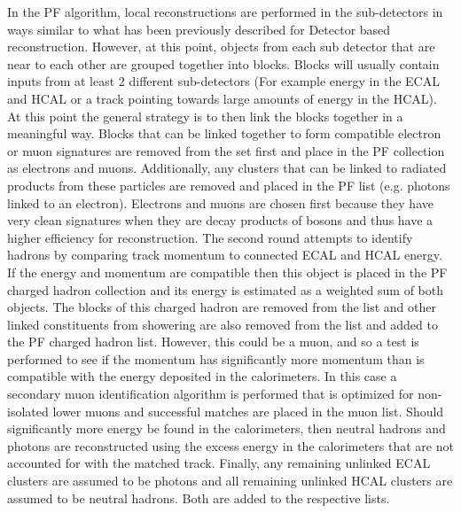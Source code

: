 	In the PF algorithm, local reconstructions are performed in the sub-detectors in ways similar to what has been previously described for Detector based reconstruction. However, at this point, objects from each sub detector that are near to each other are grouped together into blocks. Blocks will usually contain inputs from at least 2 different sub-detectors (For example energy in the ECAL and HCAL or a track pointing towards large amounts of energy in the HCAL). At this point the general strategy is to then link the blocks together in a meaningful way. Blocks that can be linked together to form compatible electron or muon signatures are removed from the set first and place in the PF collection as electrons and muons. Additionally, any clusters that can be linked to radiated products from these particles are removed and placed in the PF list (e.g. photons linked to an electron). Electrons and muons are chosen first because they have very clean signatures when they are decay products of bosons and thus have a higher efficiency for reconstruction. The second round attempts to identify hadrons by comparing track momentum to connected ECAL and HCAL energy. If the energy and momentum are compatible then this object is placed in the PF charged hadron collection and its energy is estimated as a weighted sum of both objects. The blocks of this charged hadron are removed from the list and other linked constituents from showering are also removed from the list and added to the PF charged hadron list. However, this could be a muon, and so a test is performed to see if the momentum has significantly more momentum than is compatible with the energy deposited in the calorimeters. In this case a secondary muon identification algorithm is performed that is optimized for non-isolated lower \pt muons and successful matches are placed in the muon list. Should significantly more energy be found in the calorimeters, then neutral hadrons and photons are reconstructed using the excess energy in the calorimeters that are not accounted for with the matched track. Finally, any remaining unlinked ECAL clusters are assumed to be photons and all remaining unlinked HCAL clusters are assumed to be neutral hadrons. Both are added to the respective lists.\\
	
	
	
	
	
